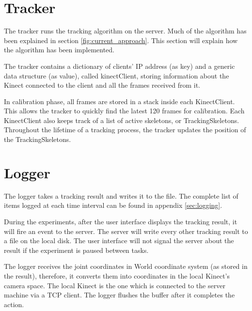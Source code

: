 \section{Tracker}
\label{sec:implementation_tracker}

The tracker runs the tracking algorithm on the server. Much of the algorithm has been explained in section \ref{fig:current_approach}. This section will explain how the algorithm has been implemented.

The tracker contains a dictionary of clients' IP address (as key) and a generic data structure (as value), called kinectClient, storing information about the Kinect connected to the client and all the frames received from it.

In calibration phase, all frames are stored in a stack inside each KinectClient. This allows the tracker to quickly find the latest 120 frames for calibration. Each KinectClient also keeps track of a list of active skeletons, or TrackingSkeletons. Throughout the lifetime of a tracking process, the tracker updates the position of the TrackingSkeletons.

\section{Logger}
\label{sec:implementation_logger}

The logger takes a tracking result and writes it to the file. The complete list of items logged at each time interval can be found in appendix \ref{sec:logging}.

During the experiments, after the user interface displays the tracking result, it will fire an event to the server. The server will write every other tracking result to a file on the local disk. The user interface will not signal the server about the result if the experiment is paused between tasks.

The logger receives the joint coordinates in World coordinate system (as stored in the result), therefore, it converts them into coordinates in the local Kinect's camera space. The local Kinect is the one which is connected to the server machine via a TCP client. The logger flushes the buffer after it completes the action.


